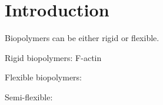 \part{Introduction}
Biopolymers can be either rigid or flexible. 

Rigid biopolymers:
F-actin

Flexible biopolymers:

Semi-flexible:

